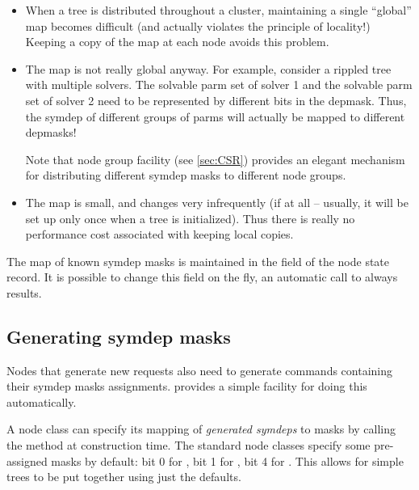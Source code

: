   \begin{itemize}
  
  \item When a tree is distributed throughout a cluster, maintaining a single
    ``global'' map becomes difficult (and actually violates the principle of
    locality!) Keeping a copy of the map at each node avoids this problem.

  \item The map is not really global anyway. For example, consider a rippled
    tree with multiple solvers. The solvable parm set of solver 1 and the
    solvable parm set of solver 2 need to be represented by different bits in
    the depmask. Thus, the  symdep of different groups of
    parms will actually be mapped to different depmasks!
    
    Note that node group facility (see \ref{sec:CSR}) provides an elegant
    mechanism for distributing different symdep masks to different node groups.

  \item The map is small, and changes very infrequently (if at all -- usually,
    it will be set up only once when a tree is initialized). Thus there is
    really no performance cost associated with keeping local copies.

  \end{itemize}
  
  The map of known symdep masks is maintained in the  field of
  the node state record. It is possible to change this field on the fly, an
  automatic call to  always results.

\subsection{Generating symdep masks}

  Nodes that generate new requests also need to generate 
  commands containing their symdep masks assignments.  provides a
  simple facility for doing this automatically.
  
  A node class can specify its mapping of {\em generated symdeps} to masks by
  calling the  method at construction time. The standard
  node classes specify some pre-assigned masks by default: bit 0 for
  , bit 1 for , bit 4 for . This
  allows for simple trees to be put together using just the defaults.

